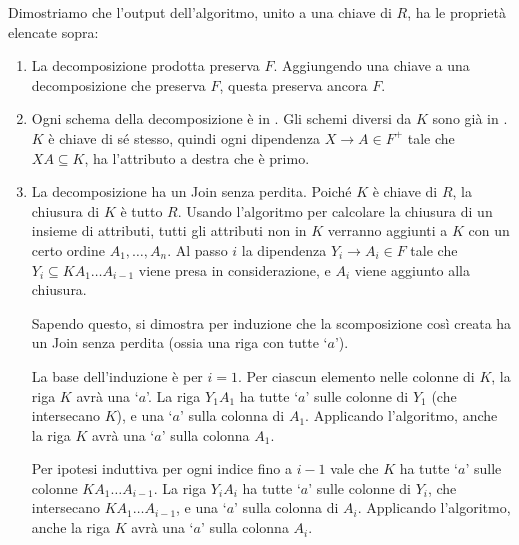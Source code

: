 Dimostriamo che l'output dell'algoritmo, unito a una chiave di $R$, ha le propriet\`a elencate sopra:
\begin{enumerate}
    \item La decomposizione prodotta preserva $F$. Aggiungendo una chiave a una decomposizione che preserva $F$, questa preserva ancora $F$.
    \item Ogni schema della decomposizione \`e in . Gli schemi diversi da $K$ sono gi\`a in . $K$ \`e chiave di s\'e stesso, quindi ogni dipendenza $X \to A \in F^+$ tale che $XA \subseteq K$, ha l'attributo a destra che \`e primo.
    \item La decomposizione ha un Join senza perdita. Poich\'e $K$ \`e chiave di $R$, la chiusura di $K$ \`e tutto $R$. Usando l'algoritmo per calcolare la chiusura di un insieme di attributi, tutti gli attributi non in $K$ verranno aggiunti a $K$ con un certo ordine $A_1, \ldots, A_n$. Al passo $i$ la dipendenza $Y_i \to A_i \in F$ tale che $Y_i \subseteq K A_1 \ldots A_{i-1}$ viene presa in considerazione, e $A_i$ viene aggiunto alla chiusura.

    Sapendo questo, si dimostra per induzione che la scomposizione cos\`i creata ha un Join senza perdita (ossia una riga con tutte `$a$').

    La base dell'induzione \`e per $i = 1$. Per ciascun elemento nelle colonne di $K$, la riga $K$ avr\`a una `$a$'. La riga $Y_1 A_1$ ha tutte `$a$' sulle colonne di $Y_1$ (che intersecano $K$), e una `$a$' sulla colonna di $A_1$. Applicando l'algoritmo, anche la riga $K$ avr\`a una `$a$' sulla colonna $A_1$.

    Per ipotesi induttiva per ogni indice fino a $i - 1$ vale che $K$ ha tutte `$a$' sulle colonne $K A_1 \ldots A_{i-1}$. La riga $Y_i A_i$ ha tutte `$a$' sulle colonne di $Y_i$, che intersecano $K A_1 \ldots A_{i-1}$, e una `$a$' sulla colonna di $A_i$. Applicando l'algoritmo, anche la riga $K$ avr\`a una `$a$' sulla colonna $A_i$.
\end{enumerate}


